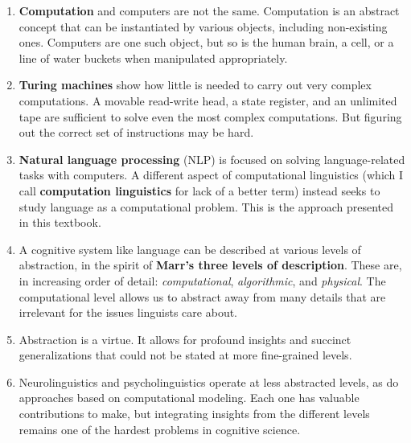 \begin{insights}
    \begin{enumerate}
        \item \textbf{Computation} and computers are not the same.
              Computation is an abstract concept that can be instantiated by various objects, including non-existing ones.
              Computers are one such object, but so is the human brain, a cell, or a line of water buckets when manipulated appropriately.
        \item \textbf{Turing machines} show how little is needed to carry out very complex computations.
              A movable read-write head, a state register, and an unlimited tape are sufficient to solve even the most complex computations.
              But figuring out the correct set of instructions may be hard.
        \item \textbf{Natural language processing} (NLP) is focused on solving language-related tasks with computers.
              A different aspect of computational linguistics (which I call \textbf{computation linguistics} for lack of a better term) instead seeks to study language as a computational problem.
              This is the approach presented in this textbook.
        \item A cognitive system like language can be described at various levels of abstraction, in the spirit of \textbf{Marr's three levels of description}.
              These are, in increasing order of detail: \emph{computational}, \emph{algorithmic}, and \emph{physical}.
              The computational level allows us to abstract away from many details that are irrelevant for the issues linguists care about.
        \item Abstraction is a virtue.
              It allows for profound insights and succinct generalizations that could not be stated at more fine-grained levels.
        \item Neurolinguistics and psycholinguistics operate at less abstracted levels, as do approaches based on computational modeling.
              Each one has valuable contributions to make, but integrating insights from the different levels remains one of the hardest problems in cognitive science.
    \end{enumerate}
\end{insights}

